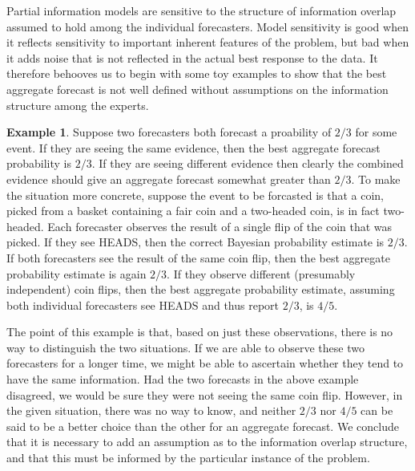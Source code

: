 \documentclass[11pt]{article}
\theoremstyle{definition}
\newtheorem{example}[theorem]{Example}
\theoremstyle{definition}
\begin{document}
Partial information models are sensitive to the structure of 
information overlap assumed to hold among the individual 
forecasters.  Model sensitivity is good when it reflects
sensitivity to important inherent features of the problem,
but bad when it adds noise that is not reflected in the
actual best response to the data.  It therefore behooves
us to begin with some toy examples to show that the best
aggregate forecast is not well defined without assumptions
on the information structure among the experts.

\begin{example}
Suppose two forecasters both forecast a proability of $2/3$ for
some event.  If they are seeing the same evidence, then the best
aggregate forecast probability is $2/3$.  If they are seeing
different evidence then clearly the combined evidence should give
an aggregate forecast somewhat greater than $2/3$.  To make the
situation more concrete, suppose the event to be forcasted is that
a coin, picked from a basket containing a fair coin and a two-headed
coin, is in fact two-headed.  Each forecaster observes the result
of a single flip of the coin that was picked.  If they see HEADS,
then the correct Bayesian probability estimate is $2/3$.  If both
forecasters see the result of the same coin flip, then the best
aggregate probability estimate is again $2/3$.  If they observe
different (presumably independent) coin flips, then the best
aggregate probability estimate, assuming both individual forecasters
see HEADS and thus report $2/3$, is $4/5$.  
\end{example}

The point of this example is that, based on just these observations, 
there is no way to distinguish the two situations.  If we are able
to observe these two forecasters for a longer time, we might be
able to ascertain whether they tend to have the same information.
Had the two forecasts in the above example disagreed, we would be
sure they were not seeing the same coin flip.  However, in the given
situation, there was no way to know, and neither $2/3$ nor $4/5$ 
can be said to be a better choice than the other for an aggregate
forecast.  We conclude that it is necessary to add an assumption
as to the information overlap structure, and that this must be
informed by the particular instance of the problem.
\end{document}
